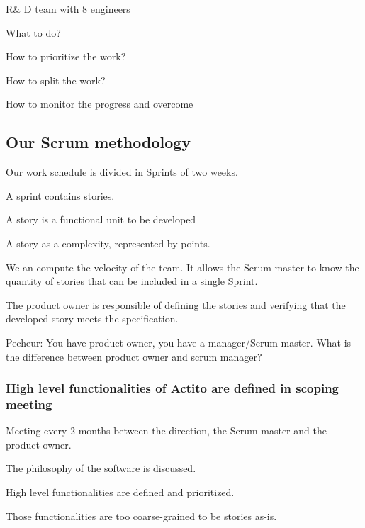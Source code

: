 \documentclass[a4paper, 11pt]{article}
\begin{document}
    R\& D team with 8 engineers

    What to do?

    How to prioritize the work?

    How to split the work?

    How to monitor the progress and overcome

    \subsection{Our Scrum methodology}

    Our work schedule is divided in Sprints of two weeks.

    A sprint contains stories.

    A story is a functional unit to be developed

    A story as a complexity, represented by points.

    We an compute the velocity of the team. It allows the Scrum master to
    know the quantity of stories that can be included in a single Sprint.

    The product owner is responsible of defining the stories and verifying that the developed
    story meets the specification.

    Pecheur: You have product owner, you have a manager/Scrum master. What is the difference
    between product owner and scrum manager?

    \subsubsection{High level functionalities of Actito are defined in scoping meeting}

    Meeting every 2 months between the direction, the Scrum master and the product owner.

    The philosophy of the software is discussed.

    High level functionalities are defined and prioritized.

    Those functionalities are too coarse-grained to be stories as-is.
\end{document}
